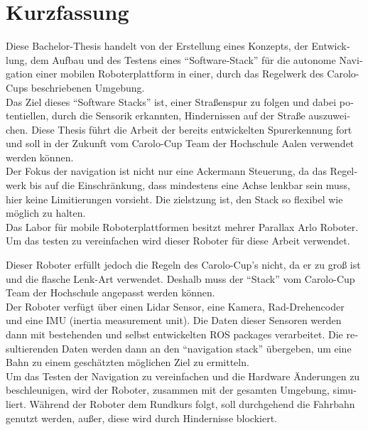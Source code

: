\chapter*{Kurzfassung}
\label{kurzfassung}

\begin{otherlanguage}{ngerman}
Diese Bachelor-Thesis handelt von der Erstellung eines Konzepts, der Entwicklung, dem Aufbau und des Testens eines ``Software-Stack'' für die autonome Navigation einer mobilen Roboterplattform in einer, durch das Regelwerk des Carolo-Cups beschriebenen Umgebung.\\

Das Ziel dieses ``Software Stacks'' ist, einer Straßenspur zu folgen und dabei potentiellen, durch die Sensorik erkannten, Hindernissen auf der Straße auszuweichen. Diese Thesis führt die Arbeit der bereits entwickelten Spurerkennung fort und soll in der Zukunft vom Carolo-Cup Team der Hochschule Aalen verwendet werden können.\\

Der Fokus der navigation ist nicht nur eine Ackermann Steuerung, da das Regelwerk bis auf die Einschränkung, dass mindestens eine Achse lenkbar sein muss, hier keine Limitierungen vorsieht\cite{carolocup}. Die zielstzung ist, den Stack so flexibel wie möglich zu halten.\\

Das Labor für mobile Roboterplattformen besitzt mehrer Parallax Arlo Roboter. Um das testen zu vereinfachen wird dieser Roboter für diese Arbeit verwendet.

Dieser Roboter erfüllt jedoch die Regeln des Carolo-Cup's nicht, da er zu groß ist und die flasche Lenk-Art verwendet. Deshalb muss der ``Stack'' vom Carolo-Cup Team der Hochschule angepasst werden können.\\

Der Roboter verfügt über einen Lidar Sensor, eine Kamera, Rad-Drehencoder und eine IMU (inertia measurement unit). Die Daten dieser Sensoren werden dann mit bestehenden und selbst entwickelten ROS packages verarbeitet. Die resultierenden Daten werden dann an den ``navigation stack'' übergeben, um eine Bahn zu einem geschätzten möglichen Ziel zu ermitteln.\\

Um das Testen der Navigation zu vereinfachen und die Hardware Änderungen zu beschleunigen, wird der Roboter, zusammen mit der gesamten Umgebung, simuliert.
Während der Roboter dem Rundkurs folgt, soll durchgehend die Fahrbahn genutzt werden, außer, diese wird durch Hindernisse blockiert.

\end{otherlanguage}
